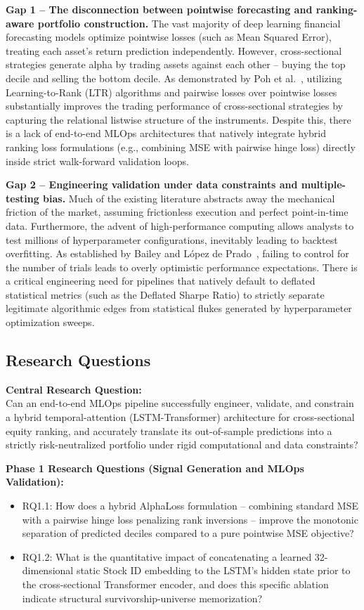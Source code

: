 \documentclass[twoside,final]{hcmut-report}
\begin{document}
\textbf{Gap 1 -- The disconnection between pointwise forecasting and ranking-aware portfolio construction.} The vast majority of deep learning financial forecasting models optimize pointwise losses (such as Mean Squared Error), treating each asset's return prediction independently. However, cross-sectional strategies generate alpha by trading assets against each other -- buying the top decile and selling the bottom decile. As demonstrated by Poh et al.~\cite{Poh2020}, utilizing Learning-to-Rank (LTR) algorithms and pairwise losses over pointwise losses substantially improves the trading performance of cross-sectional strategies by capturing the relational listwise structure of the instruments. Despite this, there is a lack of end-to-end MLOps architectures that natively integrate hybrid ranking loss formulations (e.g., combining MSE with pairwise hinge loss) directly inside strict walk-forward validation loops.

\textbf{Gap 2 -- Engineering validation under data constraints and multiple-testing bias.} Much of the existing literature abstracts away the mechanical friction of the market, assuming frictionless execution and perfect point-in-time data. Furthermore, the advent of high-performance computing allows analysts to test millions of hyperparameter configurations, inevitably leading to backtest overfitting. As established by Bailey and L\'opez de Prado~\cite{BaileyLopezdePrado2014}, failing to control for the number of trials leads to overly optimistic performance expectations. There is a critical engineering need for pipelines that natively default to deflated statistical metrics (such as the Deflated Sharpe Ratio) to strictly separate legitimate algorithmic edges from statistical flukes generated by hyperparameter optimization sweeps.

\subsection{Research Questions}

\textbf{Central Research Question:}\\
Can an end-to-end MLOps pipeline successfully engineer, validate, and constrain a hybrid temporal-attention (LSTM-Transformer) architecture for cross-sectional equity ranking, and accurately translate its out-of-sample predictions into a strictly risk-neutralized portfolio under rigid computational and data constraints?

\textbf{Phase 1 Research Questions (Signal Generation and MLOps Validation):}
\begin{itemize}
  \item RQ1.1: How does a hybrid AlphaLoss formulation -- combining standard MSE with a pairwise hinge loss penalizing rank inversions -- improve the monotonic separation of predicted deciles compared to a pure pointwise MSE objective?
  \item RQ1.2: What is the quantitative impact of concatenating a learned 32-dimensional static Stock ID embedding to the LSTM's hidden state prior to the cross-sectional Transformer encoder, and does this specific ablation indicate structural survivorship-universe memorization?
\end{itemize}
\end{document}
